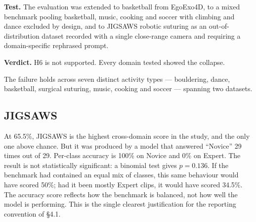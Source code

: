 \documentclass[logo,msc]{infthesis}
\newcommand{\runin}[1]{\par\medskip\noindent\textbf{#1}}
\begin{document}
\runin{Test.} The evaluation was extended to basketball from EgoExo4D,
to a mixed benchmark pooling basketball, music, cooking and soccer with
climbing and dance excluded by design, and to JIGSAWS robotic suturing as
an out-of-distribution dataset recorded with a single close-range camera
and requiring a domain-specific rephrased prompt.

\runin{Verdict.} H6 is not supported. Every domain tested showed the
collapse.

\begin{table}[H]
\centering
\caption{Cross-domain and cross-dataset results, Qwen2.5-VL-7B, 8 frames.}
\label{tab:crossdomain}
\footnotesize
{}
\end{table}

The failure holds across seven distinct activity types --- bouldering,
dance, basketball, surgical suturing, music, cooking and soccer --- spanning
two datasets.

\subsection{JIGSAWS}

At 65.5\%, JIGSAWS is the highest cross-domain score in the study, and the
only one above chance. But it was produced by a model that answered
``Novice'' 29 times out of 29. Per-class accuracy is 100\% on Novice and
0\% on Expert. The result is not statistically significant: a binomial test
gives $p = 0.136$. If the benchmark had contained an equal mix of classes,
this same behaviour would have scored 50\%; had it been mostly Expert
clips, it would have scored 34.5\%. The accuracy score reflects how the
benchmark is balanced, not how well the model is performing. This is the
single clearest justification for the reporting convention of §4.1.
\end{document}
